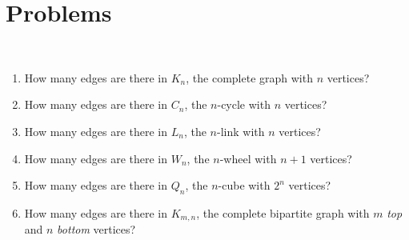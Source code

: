 \clearpage
\section{Problems}

\begin{prob}
\
 \begin{enumerate}[label = (\alph*)]
\item How many edges are there in $K_n$, the complete graph with $n$ vertices?
\item How many edges are there in $C_n$, the $n${-}cycle with $n$ vertices?
\item How many edges are there in $L_n$, the $n${-}link with $n$ vertices?
\item How many edges are there in $W_n$, the $n${-}wheel with $n+1$ vertices?
\item How many edges are there in $Q_n$, the $n${-}cube with $2^n$  vertices?
\item How many edges are there in $K_{m,n}$, the complete bipartite graph with $m$ {\itshape top} and $n$ {\itshape bottom} vertices?
\end{enumerate}
\end{prob}

